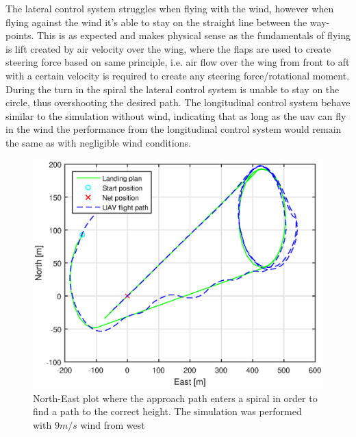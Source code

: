 The lateral control system struggles when flying with the wind, however when flying against the wind it's able to stay on the straight line between the way-points. This is as expected and makes physical sense as the fundamentals of flying is lift created by air velocity over the wing, where the flaps are used to create steering force based on same principle, i.e. air flow over the wing from front to aft with a certain velocity is required to create any steering force/rotational moment. During the turn in the spiral the lateral control system is unable to stay on the circle, thus overshooting the desired path. The longitudinal control system behave similar to the simulation without wind, indicating that as long as the \gls{uav} can fly in the wind the performance from the longitudinal control system would remain the same as with negligible wind conditions.
\begin{figure}[H]
\centering
\includegraphics[scale=0.7]{figs/SysPlot/SILNorthEast6juni092307.eps}
\caption{North-East plot where the approach path enters a spiral in order to find a path to the correct height. The simulation was performed with $9 m/s$ wind from west}
\label{Fig:SILNorthEastSpiral092307}
\end{figure}
